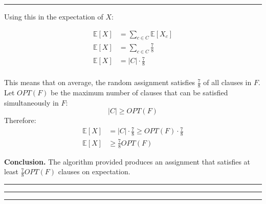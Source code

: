 \documentclass[11pt, english]{article}
\newenvironment{answer}{%
  \par\noindent\hrule %
  \vspace{0.25\baselineskip}%
  \noindent{\Large\bfseries Answer}\par\vspace{0.25\baselineskip}\noindent\ignorespaces
}{%
  \par\vspace{0.5\baselineskip}%
  \noindent\hrule\vspace{0.5\baselineskip}%
  \hrule\hrule
}
\begin{document}
\begin{answer}
\noindent Using this in the expectation of $X$:

\begin{align*}
\mathbb{E}[X] &= \sum_{c \in C} \mathbb{E}[X_{c}] \\
\mathbb{E}[X] &= \sum_{c \in C} \frac{7}{8} \\
\mathbb{E}[X] &= |C| \cdot \frac{7}{8} \\
\end{align*}

\noindent This means that on average, the random assignment satisfies $\frac{7}{8}$ of all clauses in $F$. \\
\noindent Let $OPT(F)$ be the maximum number of clauses that can be 
satisfied simultaneously in $F$:
\[
|C| \geq OPT(F)
\]
\noindent Therefore:
\begin{align*}
  \mathbb{E}[X] &= |C| \cdot \frac{7}{8} \geq OPT(F)\cdot \frac{7}{8}\\
  \mathbb{E}[X] &\geq \frac{7}{8} OPT(F)
\end{align*}

\medskip
\noindent
\textbf{Conclusion.}  
The algorithm provided produces an assignment that satisfies at least $\frac{7}{8} OPT(F)$ clauses on expectation.
\end{answer}
\end{document}
